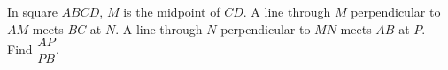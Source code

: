 In square $ABCD$, $M$ is the midpoint of $CD$. A line through $M$ perpendicular to $AM$ meets $BC$ at $N$. A line through $N$ perpendicular to $MN$ meets $AB$ at $P$. Find $\dfrac{AP}{PB}$.
